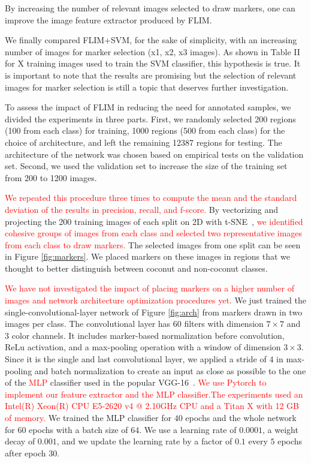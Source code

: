 \documentclass[journal, twoside]{IEEEtran}
\begin{document}
{By increasing the number of relevant images selected to draw markers, one can improve the image feature extractor produced by FLIM. 

            We finally compared FLIM+SVM, for the sake of simplicity, with an increasing number of images for marker selection (x1, x2, x3 images). As shown in Table II for X training images used to train the SVM classifier, this hypothesis is true. It is important to note that the results are promising but the selection of relevant images for marker selection is still a topic that deserves further investigation.  




To assess the impact of FLIM in reducing the need for annotated samples, we
divided the experiments in three parts. First, we randomly selected 200 regions (100 from each class) for training, 1000 regions (500 from each class) for the choice of architecture, and left the remaining 12387 regions for testing. The architecture of the network was chosen based on empirical tests on the validation set. Second, we used the validation set to increase the size of the training set from 200 to 1200 images. 

\textcolor{red}{We repeated this procedure three times to compute the mean and the standard deviation of the results in precision, recall, and f-score.} By vectorizing and projecting the 200 training images of each split on 2D with t-SNE~\cite{maaten2008visualizing}, \textcolor{red}{we identified cohesive groups of images from each class and selected two representative images from each class to draw markers.}  The selected images from one split can be seen in Figure \ref{fig:markers}. We placed markers on these images in regions that we thought to better distinguish between coconut and non-coconut classes.

\textcolor{red}{We have not investigated the impact of placing markers on a higher number of images and network architecture optimization procedures yet.} We just trained the single-convolutional-layer network of Figure \ref{fig:arch} from markers drawn in two images per class. The convolutional layer has $60$ filters with dimension $7 \times 7$ and 3 color channels. It includes marker-based normalization before convolution, ReLu activation, and a max-pooling operation with a window of dimension $3 \times 3$. Since it is the single and last convolutional layer, we applied a stride of $4$ in max-pooling and batch normalization to create an input as close as possible to the one of the \textcolor{red}{MLP} classifier used in the popular VGG-16~\cite{simonyan2014very}. \textcolor{red}{We use Pytorch to implement our feature extractor and the MLP classifier.The experiments used an Intel(R) Xeon(R) CPU E5-2620 v4 @ 2.10GHz CPU and a Titan X with 12 GB of memory.} We trained the MLP classifier for $40$ epochs and the whole network for $60$ epochs with a batch size of $64$. We use a learning rate of $0.0001$, a weight decay of $0.001$, and we update the learning rate by a factor of $0.1$ every $5$ epochs after epoch 30.

}
\end{document}
